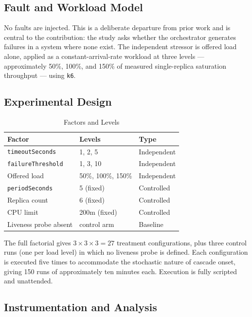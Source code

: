 \documentclass[conference]{IEEEtran}
\begin{document}
\subsection{Fault and Workload Model}

No faults are injected. This is a deliberate departure from prior work
and is central to the contribution: the study asks whether the
orchestrator generates failures in a system where none exist. The
independent stressor is offered load alone, applied as a
constant-arrival-rate workload at three levels --- approximately
50\%, 100\%, and 150\% of measured single-replica saturation
throughput --- using \texttt{k6}.

\subsection{Experimental Design}

\begin{table}[h]
\centering
\caption{Factors and Levels}
\label{tab:factors}
\footnotesize
\begin{tabular}{@{}p{}p{}p{}@{}}
\toprule
\textbf{Factor} & \textbf{Levels} & \textbf{Type} \\
\midrule
\texttt{timeoutSeconds} & 1, 2, 5 & Independent \\
\texttt{failureThreshold} & 1, 3, 10 & Independent \\
Offered load & 50\%, 100\%, 150\% & Independent \\
\texttt{periodSeconds} & 5 (fixed) & Controlled \\
Replica count & 6 (fixed) & Controlled \\
CPU limit & 200m (fixed) & Controlled \\
Liveness probe absent & control arm & Baseline \\
\bottomrule
\end{tabular}
\end{table}

The full factorial gives $3 \times 3 \times 3 = 27$ treatment
configurations, plus three control runs (one per load level) in which
no liveness probe is defined. Each configuration is executed five
times to accommodate the stochastic nature of cascade onset, giving
150 runs of approximately ten minutes each. Execution is fully
scripted and unattended.

\subsection{Instrumentation and Analysis}
\end{document}
